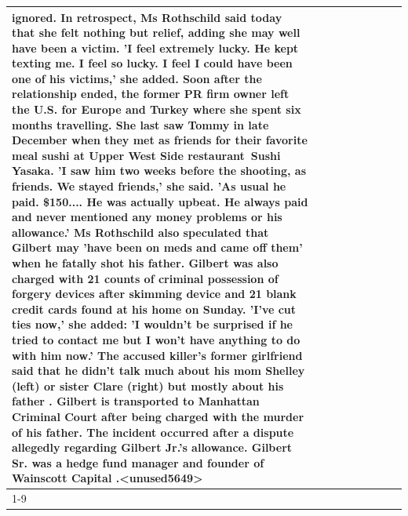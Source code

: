 \begin{table}[H]
\begin{tabular}{lllrlllll}
ignored. In retrospect, Ms Rothschild said today that she felt nothing but relief, adding she may well have been a victim. 'I feel extremely lucky. He kept texting me. I feel so lucky. I feel I could have been one of his victims,' she added. Soon after the relationship ended, the former PR firm owner left the U.S. for Europe and Turkey where she spent six months  travelling. She last saw Tommy in late December when they met as friends for their favorite meal sushi at Upper West Side restaurant Sushi Yasaka. 'I saw him two weeks before the shooting, as friends. We stayed friends,' she said. 'As usual he paid. \$150.... He was actually upbeat. He always paid and never mentioned any money problems or his allowance.' Ms Rothschild also speculated that Gilbert may 'have been on meds and came off them' when he fatally shot his father. Gilbert was also charged with 21 counts of criminal possession of forgery devices after skimming device and 21 blank credit cards found at his home on Sunday. 'I've cut ties now,' she added: 'I wouldn’t be surprised if he tried to contact me but I won’t have anything to do with him now.' The accused killer's former girlfriend said that he didn't talk much about his mom Shelley (left) or sister Clare (right) but mostly about his father . Gilbert is transported to Manhattan Criminal Court  after being charged with the murder of his father. The incident occurred after a dispute allegedly regarding Gilbert Jr.'s allowance. Gilbert Sr. was a hedge fund manager and founder of Wainscott Capital .<unused5649> \\
\cline{1-9}

\end{tabular}
\end{table}
